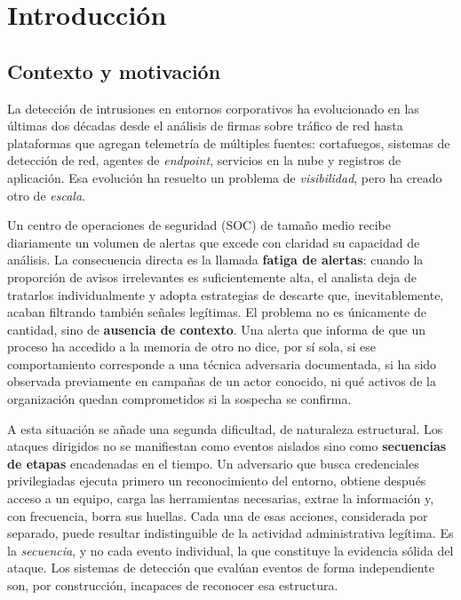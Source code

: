 \chapter{Introducción}
\label{cap:introduccion}

\section{Contexto y motivación}

La detección de intrusiones en entornos corporativos ha evolucionado en las últimas dos
décadas desde el análisis de firmas sobre tráfico de red hasta plataformas que agregan
telemetría de múltiples fuentes: cortafuegos, sistemas de detección de red, agentes de
\textit{endpoint}, servicios en la nube y registros de aplicación. Esa evolución ha
resuelto un problema de \textit{visibilidad}, pero ha creado otro de \textit{escala}.

Un centro de operaciones de seguridad (SOC) de tamaño medio recibe diariamente un volumen
de alertas que excede con claridad su capacidad de análisis. La consecuencia directa es la
llamada \textbf{fatiga de alertas}: cuando la proporción de avisos irrelevantes es
suficientemente alta, el analista deja de tratarlos individualmente y adopta estrategias de
descarte que, inevitablemente, acaban filtrando también señales legítimas. El problema no
es únicamente de cantidad, sino de \textbf{ausencia de contexto}. Una alerta que informa de
que un proceso ha accedido a la memoria de otro no dice, por sí sola, si ese comportamiento
corresponde a una técnica adversaria documentada, si ha sido observada previamente en
campañas de un actor conocido, ni qué activos de la organización quedan comprometidos si la
sospecha se confirma.

A esta situación se añade una segunda dificultad, de naturaleza estructural. Los ataques
dirigidos no se manifiestan como eventos aislados sino como \textbf{secuencias de etapas}
encadenadas en el tiempo. Un adversario que busca credenciales privilegiadas ejecuta primero
un reconocimiento del entorno, obtiene después acceso a un equipo, carga las herramientas
necesarias, extrae la información y, con frecuencia, borra sus huellas. Cada una de esas
acciones, considerada por separado, puede resultar indistinguible de la actividad
administrativa legítima. Es la \textit{secuencia}, y no cada evento individual, la que
constituye la evidencia sólida del ataque. Los sistemas de detección que evalúan eventos de
forma independiente son, por construcción, incapaces de reconocer esa estructura.

